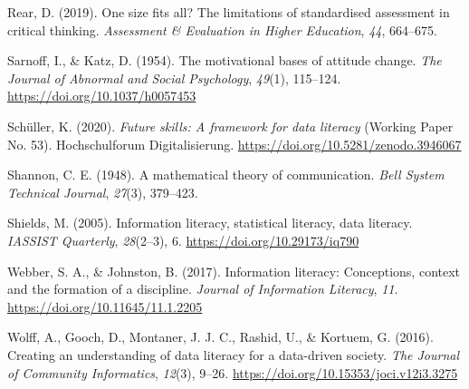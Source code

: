 \documentclass[
  12pt,
  a4paper,
  twoside]{article}
\newlength{\cslhangindent}
\newenvironment{CSLReferences}[2] %
 {\begin{list}{}{%
  \setlength{\itemindent}{0pt}
  \setlength{\leftmargin}{0pt}
  \setlength{\parsep}{0pt}
  \ifodd #1
   \setlength{\leftmargin}{\cslhangindent}
   \setlength{\itemindent}{-1\cslhangindent}
  \fi
  \setlength{\itemsep}{#2\baselineskip}}}
 {\end{list}}
\begin{document}
\begin{CSLReferences}{1}{0}
Rear, D. (2019). One size fits all? The limitations of standardised assessment in critical thinking. \emph{Assessment \& Evaluation in Higher Education}, \emph{44}, 664--675.

Sarnoff, I., \& Katz, D. (1954). The motivational bases of attitude change. \emph{The Journal of Abnormal and Social Psychology}, \emph{49}(1), 115--124. \url{https://doi.org/10.1037/h0057453}

Schüller, K. (2020). \emph{Future skills: A framework for data literacy} (Working Paper No. 53). Hochschulforum Digitalisierung. \url{https://doi.org/10.5281/zenodo.3946067}

Shannon, C. E. (1948). A mathematical theory of communication. \emph{Bell System Technical Journal}, \emph{27}(3), 379--423.

Shields, M. (2005). Information literacy, statistical literacy, data literacy. \emph{IASSIST Quarterly}, \emph{28}(2--3), 6. \url{https://doi.org/10.29173/iq790}

Webber, S. A., \& Johnston, B. (2017). Information literacy: Conceptions, context and the formation of a discipline. \emph{Journal of Information Literacy}, \emph{11}. \url{https://doi.org/10.11645/11.1.2205}

Wolff, A., Gooch, D., Montaner, J. J. C., Rashid, U., \& Kortuem, G. (2016). Creating an understanding of data literacy for a data-driven society. \emph{The Journal of Community Informatics}, \emph{12}(3), 9--26. \url{https://doi.org/10.15353/joci.v12i3.3275}

\end{CSLReferences}
\end{document}
